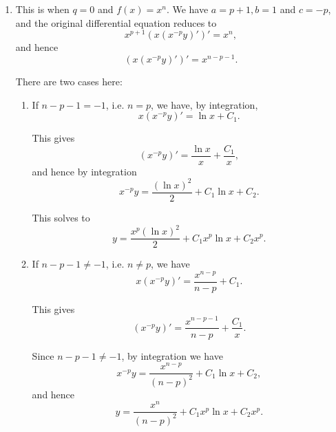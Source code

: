 \begin{enumerate}
    \item This is when \(q = 0\) and \(f(x) = x^n\). We have \(a = p + 1, b = 1\) and \(c = -p\), and the original differential equation reduces to
          \[
              x^{p + 1} \left(x \left(x^{-p} y\right)' \right)' = x^n,
          \]
          and hence
          \[
              \left(x \left(x^{-p} y\right)' \right)' = x^{n - p - 1}.
          \]

          There are two cases here:
          \begin{enumerate}
              \item If \(n - p - 1 = -1\), i.e. \(n = p\), we have, by integration,
                    \[
                        x \left(x^{-p} y\right)' = \ln x + C_1.
                    \]

                    This gives
                    \[
                        \left(x^{-p} y\right)' = \frac{\ln x}{x} + \frac{C_1}{x},
                    \]
                    and hence by integration
                    \[
                        x^{-p} y = \frac{(\ln x)^2}{2} + C_1 \ln x + C_2.
                    \]

                    This solves to
                    \[
                        y = \frac{x^p (\ln x)^2}{2} + C_1 x^p \ln x + C_2 x^p.
                    \]

              \item If \(n - p - 1 \neq -1\), i.e. \(n \neq p\), we have
                    \[
                        x \left(x^{-p} y\right)' = \frac{x^{n - p}}{n - p} + C_1.
                    \]

                    This gives
                    \[
                        \left(x^{-p} y\right)' = \frac{x^{n - p - 1}}{n - p} + \frac{C_1}{x}.
                    \]

                    Since \(n - p - 1 \neq -1\), by integration we have
                    \[
                        x^{-p} y = \frac{x^{n - p}}{(n - p)^2} + C_1 \ln x + C_2,
                    \]
                    and hence
                    \[
                        y = \frac{x^n}{(n - p)^2} + C_1 x^p \ln x + C_2 x^p.
                    \]
          \end{enumerate}
\end{enumerate}